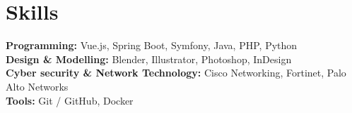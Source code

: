 \section*{Skills}

\noindent
\textbf{Programming:} Vue.js, Spring Boot, Symfony, Java, PHP, Python\\
\textbf{Design \& Modelling:} Blender, Illustrator, Photoshop, InDesign\\
\textbf{Cyber security \& Network Technology:} Cisco Networking, Fortinet, Palo Alto Networks\\
\textbf{Tools:} Git / GitHub, Docker
